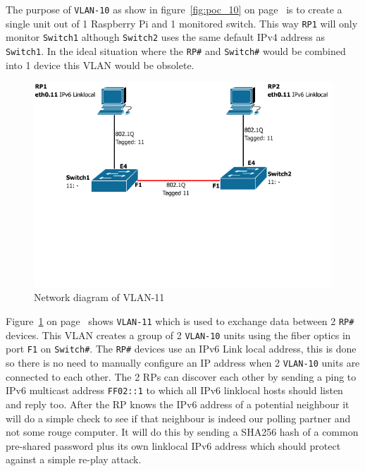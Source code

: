 \documentclass{article}
\begin{document}
The purpose of \texttt{VLAN-10} as show in figure~\ref{fig:poc_10} on page~\pageref{fig:poc_10} is to create a single unit out of 1 Raspberry Pi and 1 monitored switch. This way \texttt{RP1} will only monitor \texttt{Switch1} although \texttt{Switch2} uses the same default IPv4 address as \texttt{Switch1}. In the ideal situation where the \texttt{RP\#} and \texttt{Switch\#} would be combined into 1 device this VLAN would be obsolete.

\begin{figure}[h]
\centerline{\includegraphics[scale=0.4, trim = 0mm 70mm 0mm 0mm]{images/PoC_11.png}}
\caption{Network diagram of VLAN-11}
\label{fig:poc_11}
\end{figure}

Figure~\ref{fig:poc_11} on page~\pageref{fig:poc_11} shows \texttt{VLAN-11} which is used to exchange data between 2 \texttt{RP\#} devices. This VLAN creates a group of 2 \texttt{VLAN-10} units using the fiber optics in port \texttt{F1} on \texttt{Switch\#}. The \texttt{RP\#} devices use an IPv6 Link local address, this is done so there is no need to manually configure an IP address when 2  \texttt{VLAN-10} units are connected to each other. The 2 RPs can discover each other by sending a ping to IPv6 multicast address \texttt{FF02::1} to which all IPv6 linklocal hosts should listen and reply too\cite{ietf:rfc4291}. After the RP knows the IPv6 address of a potential neighbour it will do a simple check to see if that neighbour is indeed our polling partner and not some rouge computer. It will do this by sending a SHA256 hash of a common pre-shared password plus its own linklocal IPv6 address which should protect against a simple re-play attack.
\end{document}
